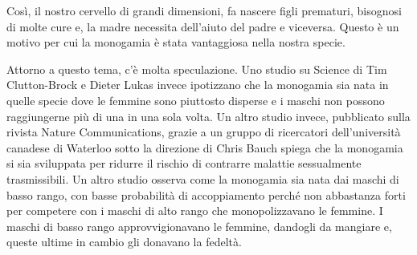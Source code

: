 \documentclass[12pt]{book} %
\begin{document}
Così, il nostro cervello di grandi dimensioni, fa nascere figli prematuri, bisognosi di molte cure e, la madre necessita dell'aiuto del padre e viceversa. Questo è un motivo per cui la monogamia è stata vantaggiosa nella nostra specie.

Attorno a questo tema, c'è molta speculazione. Uno studio su Science di Tim Clutton-Brock e Dieter Lukas invece ipotizzano che la monogamia sia nata in quelle specie dove le femmine sono piuttosto disperse e i maschi non possono raggiungerne più di una in una sola volta. Un altro studio invece, pubblicato sulla rivista Nature Communications, grazie a un
gruppo di ricercatori dell'università canadese di Waterloo sotto la direzione di Chris Bauch
spiega che la monogamia si sia sviluppata per ridurre il rischio di contrarre malattie sessualmente
trasmissibili. Un altro studio osserva come la monogamia sia
nata dai maschi di basso rango, con basse probabilità di accoppiamento perché non abbastanza forti per competere con i
maschi di alto rango che monopolizzavano le femmine. I maschi di basso rango approvvigionavano le femmine, dandogli da
mangiare e, queste ultime in cambio gli donavano la fedeltà.
\end{document}
